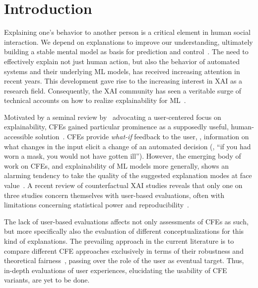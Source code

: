 \section{Introduction}\label{sec:introduction}

Explaining one's behavior to another person is a critical element in human social interaction. 
We depend on explanations to improve our understanding, ultimately building a stable mental model as basis for prediction and control~\citep{heider_psychology_1958}. 
The need to effectively explain not just human action, but also the behavior of automated systems and their underlying \gls{ML} models, has received increasing attention in recent years. This development gave rise to the increasing interest in \gls{XAI} as a research field. 
Consequently, the \gls{XAI} community has seen a veritable surge of technical accounts on how to realize explainability for \gls{ML}~\citep{guidotti_survey_2019}. 

Motivated by a seminal review by~\citeauthor{miller_explanation_2019} advocating a user-centered focus on explainability, \glspl{CFE} gained particular prominence as a supposedly useful, human-accessible solution~\citep{miller_explanation_2019,keane_if_2021}.
\glspl{CFE} provide \textit{what-if} feedback to the user, \ie, information on what changes in the input elicit a change of an automated decision (\ie, ``if you had worn a mask, you would not have gotten ill''). %
However, the emerging body of work on \glspl{CFE}, and explainability of \gls{ML} models more generally, shows an alarming tendency to take the quality of the suggested explanation modes at face value~\citep{doshi-velez_towards_2017, offert_i_2017}.
A recent review of counterfactual \gls{XAI} studies reveals that only one on three studies concern themselves with user-based evaluations, often with limitations concerning statistical power and reproducibility~\citep{keane_if_2021}.

The lack of user-based evaluations affects not only assessments of \glspl{CFE} as such, but more specifically also the evaluation of different conceptualizations for this kind of explanations.
The prevailing approach in the current literature is to compare different \gls{CFE} approaches exclusively in terms of their robustness and theoretical fairness~\citep{artelt_evaluating_2021, de_oliveira_framework_2021, white_measurable_2020}, passing over the role of the user as eventual target.  
Thus, in-depth evaluations of user experiences, elucidating the usability of \gls{CFE} variants, are yet to be done.

